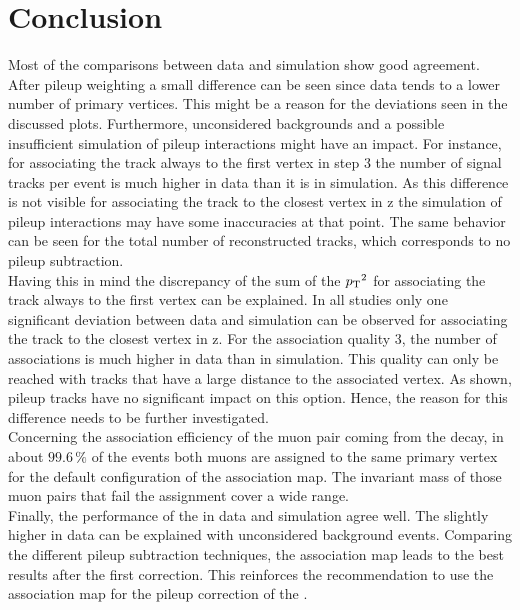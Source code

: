 \section{Conclusion}

Most of the comparisons between data and simulation show good agreement. After pileup weighting a small difference can be seen since data tends to a lower number of primary vertices. This might be a reason for the deviations seen in the discussed plots. Furthermore, unconsidered backgrounds and a possible insufficient simulation of pileup interactions might have an impact. For instance, for associating the track always to the first vertex in step 3 the number of signal tracks per event is much higher in data than it is in simulation. As this difference is not visible for associating the track to the closest vertex in z the simulation of pileup interactions may have some inaccuracies at that point. The same behavior can be seen for the total number of reconstructed tracks, which corresponds to no pileup subtraction.\\
Having this in mind the discrepancy of the sum of the $p_{\mathrm{T}}{}^{2}$ for associating the track always to the first vertex can be explained. In all studies only one significant deviation between data and simulation can be observed for associating the track to the closest vertex in z. For the association quality 3, the number of associations is much higher in data than in simulation. This quality can only be reached with tracks that have a large distance to the associated vertex. As shown, pileup tracks have no significant impact on this option. Hence, the reason for this difference needs to be further investigated.\\
Concerning the association efficiency of the muon pair coming from the \Zz decay, in about $99.6\,\%$ of the events both muons are assigned to the same primary vertex for the default configuration of the association map. The invariant mass of those muon pairs that fail the assignment cover a wide range. \\
Finally, the performance of the \MET{} in data and simulation agree well. The slightly higher \MET{} in data can be explained with unconsidered background events. Comparing the different pileup subtraction techniques, the association map leads to the best results after the first correction. This reinforces the recommendation to use the association map for the pileup correction of the \MET{}.
